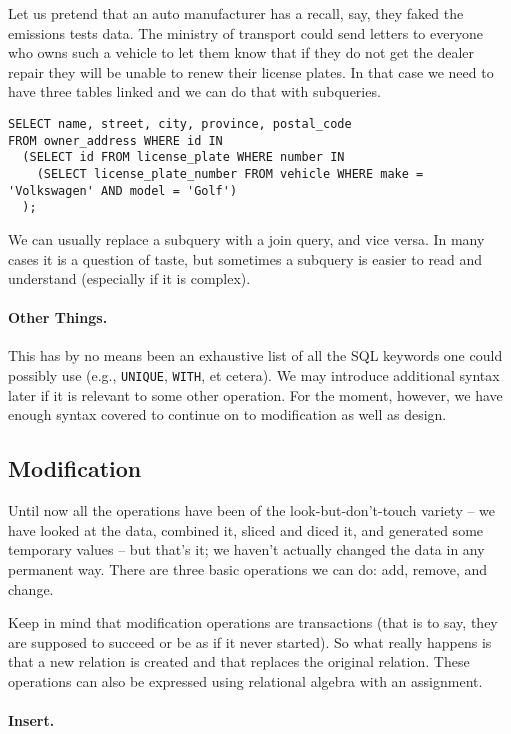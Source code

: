 Let us pretend that an auto manufacturer has a recall, say, they faked the emissions tests data. The ministry of transport could send letters to everyone who owns such a vehicle to let them know that if they do not get the dealer repair they will be unable to renew their license plates. In that case we need to have three tables linked and we can do that with subqueries.

\begin{verbatim}
SELECT name, street, city, province, postal_code 
FROM owner_address WHERE id IN 
  (SELECT id FROM license_plate WHERE number IN 
    (SELECT license_plate_number FROM vehicle WHERE make = 'Volkswagen' AND model = 'Golf')
  );
\end{verbatim}

We can usually replace a subquery with a join query, and vice versa. In many cases it is a question of taste, but sometimes a subquery is easier to read and understand (especially if it is complex). 

\paragraph{Other Things.}
This has by no means been an exhaustive list of all the SQL keywords one could possibly use (e.g., \texttt{UNIQUE}, \texttt{WITH}, et cetera). We may introduce additional syntax later if it is relevant to some other operation. For the moment, however, we have enough syntax covered to continue on to modification as well as design. 

\subsection*{Modification}

Until now all the operations have been of the look-but-don't-touch variety -- we have looked at the data, combined it, sliced and diced it, and generated some temporary values -- but that's it; we haven't actually changed the data in any permanent way. There are three basic operations we can do: add, remove, and change.

Keep in mind that modification operations are transactions (that is to say, they are supposed to succeed or be as if it never started). So what really happens is that a new relation is created and that replaces the original relation. These operations can also be expressed using relational algebra with an assignment. 



\paragraph{Insert.}

